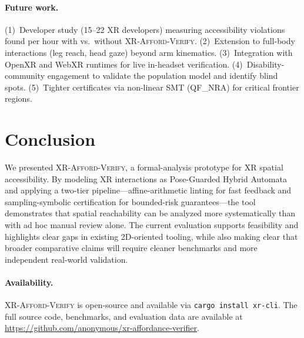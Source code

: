 \documentclass[11pt,letterpaper]{article}
\newcommand{\tool}{\textsc{XR-Afford-Verify}}
\begin{document}
\paragraph{Future work.}
(1)~Developer study (15--22 XR developers) measuring accessibility violations found per hour with vs.\ without \tool{}.
(2)~Extension to full-body interactions (leg reach, head gaze) beyond arm kinematics.
(3)~Integration with OpenXR and WebXR runtimes for live in-headset verification.
(4)~Disability-community engagement to validate the population model and identify blind spots.
(5)~Tighter certificates via non-linear SMT (QF\_NRA) for critical frontier regions.

\section{Conclusion}
\label{sec:conclusion}

We presented \tool{}, a formal-analysis prototype for XR spatial accessibility.
By modeling XR interactions as Pose-Guarded Hybrid Automata and applying a two-tier pipeline---affine-arithmetic linting for fast feedback and sampling-symbolic certification for bounded-risk guarantees---the tool demonstrates that spatial reachability can be analyzed more systematically than with ad hoc manual review alone.  The current evaluation supports feasibility and highlights clear gaps in existing 2D-oriented tooling, while also making clear that broader comparative claims will require cleaner benchmarks and more independent real-world validation.

\paragraph{Availability.}
\tool{} is open-source and available via \texttt{cargo install xr-cli}.
The full source code, benchmarks, and evaluation data are available at \url{https://github.com/anonymous/xr-affordance-verifier}.
\end{document}
